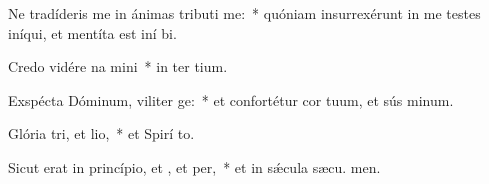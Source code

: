 \item Ne tradíderis me in ánimas tributi me:~* quóniam insurrexérunt in me testes iníqui, et mentíta est iní bi.
\item Credo vidére na mini~* in ter tium.
\item Exspécta Dóminum, viliter ge:~* et confortétur cor tuum, et sús minum.
\item Glória tri, et lio,~* et Spirí to.
\item Sicut erat in princípio, et , et per,~* et in sǽcula sæcu. men.
